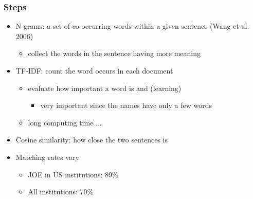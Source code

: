 \documentclass[11pt]{beamer}
\begin{document}
\begin{frame}
	\frametitle{Steps}
	\begin{itemize}
	\item N-grams: a set of co-occurring words within a given sentence (Wang et al. 2006)
	\begin{itemize}
		\item collect the words in the sentence having more meaning
	\end{itemize}
	\item TF-IDF: count the word occurs in each document
	\begin{itemize}
		\item evaluate how important a word is and (learning)
		\begin{itemize}
			\item very important since the names have only a few words
		\end{itemize}
		\item long computing time ...
	\end{itemize}
	\item Cosine similarity: how close the two sentences is
	\item Matching rates vary
	\begin{itemize}
		\item JOE in US institutions: 89\%
		\item All institutions: 70\%
	\end{itemize}
	\end{itemize}
\hyperlink{Data}{}
\end{frame}

%
%	
%
\end{document}
